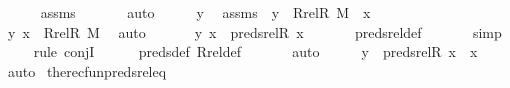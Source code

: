 \begin{isabellebody}
\ \ \ \ \isamarkupfalse%
\ assms\ \isanewline
\ \ \ \ \isamarkupfalse%
\ auto\isanewline
{}\isamarkupfalse%
\ \isanewline
\ \ \isamarkupfalse%
\ y\ \isamarkupfalse%
\ assms\ {\isacharcolon}{\kern0pt}\ {\isachardoublequoteopen}y\ {\isasymin}\ Rrel{\isacharparenleft}{\kern0pt}R{\isacharcomma}{\kern0pt}\ M{\isacharparenright}{\kern0pt}\ {\isacharminus}{\kern0pt}{\isacharbackquote}{\kern0pt}{\isacharbackquote}{\kern0pt}\ {\isacharbraceleft}{\kern0pt}x{\isacharbraceright}{\kern0pt}{\isachardoublequoteclose}\ \isanewline
\ \ \isamarkupfalse%
\ \isamarkupfalse%
\ {\isachardoublequoteopen}{\isacharless}{\kern0pt}y{\isacharcomma}{\kern0pt}\ x{\isachargreater}{\kern0pt}\ {\isasymin}\ Rrel{\isacharparenleft}{\kern0pt}R{\isacharcomma}{\kern0pt}\ M{\isacharparenright}{\kern0pt}{\isachardoublequoteclose}\ \isamarkupfalse%
\ auto\ \isanewline
\ \ \isamarkupfalse%
\ \isamarkupfalse%
\ {\isachardoublequoteopen}{\isacharless}{\kern0pt}y{\isacharcomma}{\kern0pt}\ x{\isachargreater}{\kern0pt}\ {\isasymin}\ preds{\isacharunderscore}{\kern0pt}rel{\isacharparenleft}{\kern0pt}R{\isacharcomma}{\kern0pt}\ x{\isacharparenright}{\kern0pt}{\isachardoublequoteclose}\ \isanewline
\ \ \ \ \isamarkupfalse%
\ preds{\isacharunderscore}{\kern0pt}rel{\isacharunderscore}{\kern0pt}def\ \isanewline
\ \ \ \ \isamarkupfalse%
\ simp\isanewline
\ \ \ \ \isamarkupfalse%
{\isacharparenleft}{\kern0pt}rule\ conjI{\isacharparenright}{\kern0pt}\isanewline
\ \ \ \ \isamarkupfalse%
\ preds{\isacharunderscore}{\kern0pt}def\ Rrel{\isacharunderscore}{\kern0pt}def\ \isanewline
\ \ \ \ \isamarkupfalse%
\ auto\isanewline
\ \ \isamarkupfalse%
\ \isamarkupfalse%
\ {\isachardoublequoteopen}y\ {\isasymin}\ preds{\isacharunderscore}{\kern0pt}rel{\isacharparenleft}{\kern0pt}R{\isacharcomma}{\kern0pt}\ x{\isacharparenright}{\kern0pt}\ {\isacharminus}{\kern0pt}{\isacharbackquote}{\kern0pt}{\isacharbackquote}{\kern0pt}\ {\isacharbraceleft}{\kern0pt}x{\isacharbraceright}{\kern0pt}{\isachardoublequoteclose}\ \isamarkupfalse%
\ auto\isanewline
{}\isamarkupfalse%
%
\endisatagproof
{\isafoldproof}%
%
\isadelimproof
\isanewline
%
\endisadelimproof
\isanewline
{}\isamarkupfalse%
\ the{\isacharunderscore}{\kern0pt}recfun{\isacharunderscore}{\kern0pt}preds{\isacharunderscore}{\kern0pt}rel{\isacharunderscore}{\kern0pt}eq\ {\isacharcolon}{\kern0pt}\ \isanewline

\end{isabellebody}
